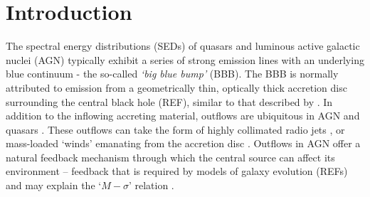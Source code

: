 \documentclass[useAMS,usenatbib]{mn2e_x}
\begin{document}



%
%

\section{Introduction}


The spectral energy distributions (SEDs) of 
quasars and luminous active galactic nuclei (AGN) 
typically exhibit a series of strong emission lines
with an underlying blue continuum - the so-called {\sl `big blue bump'} (BBB). 
The BBB is normally attributed to emission from a geometrically thin, 
optically thick accretion disc surrounding the central black hole (REF), similar
to that described by \cite{shakurasunyaev1973}.
In addition to the inflowing accreting material, 
outflows are ubiquitous in AGN
and quasars \citep{kellerman1989,ganguly2008}. These outflows can take the form of 
highly collimated radio jets \citep[e.g.][]{hazard1963,potash1980,perley1984,marscher2006}, 
or mass-loaded `winds' emanating from the accretion disc 
\citep{weymann1991,turnermiller2009}. 
Outflows in AGN offer a 
natural feedback mechanism through which the central source can 
affect its environment \citep{king2003,king2005,fabian2012}
-- feedback that is required by models of galaxy evolution (REFs) 
and may explain the `$M-\sigma$' relation \citep{silkrees1998,haring2004}.
\end{document}
